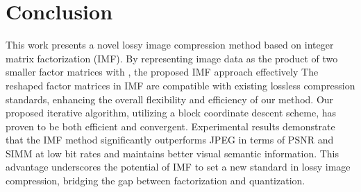 \section{Conclusion} \label{sec:conclusion}

This work presents a novel lossy image compression method based on integer matrix factorization (IMF). By representing image data as the product of two smaller factor matrices with , the proposed IMF approach effectively  The reshaped factor matrices in IMF are compatible with existing lossless compression standards, enhancing the overall flexibility and efficiency of our method. Our proposed iterative algorithm, utilizing a block coordinate descent scheme, has proven to be both efficient and convergent. Experimental results demonstrate that the IMF method significantly outperforms JPEG in terms of PSNR and SIMM at low bit rates and maintains better visual semantic information. This advantage underscores the potential of IMF to set a new standard in lossy image compression, bridging the gap between factorization and quantization.

